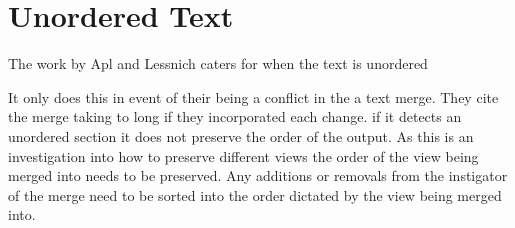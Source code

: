 
\chapter{Unordered Text}

The work by Apl and Lessnich caters for when the text is unordered

It only does this in event of their being a conflict in the a text merge.   They cite the merge taking to long if they incorporated each change.
if it detects an unordered section it does not preserve the order of the output.  As this is an investigation into how to preserve different views the order of the view being merged into needs to be preserved.  Any additions or removals from the instigator of the merge need to be sorted into the order dictated by the view being merged into.

 
